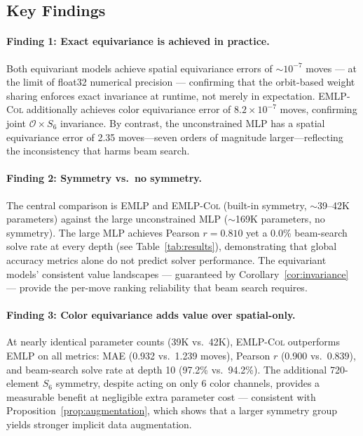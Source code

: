 \documentclass[11pt]{article}
\begin{document}
\subsection{Key Findings}

\paragraph{Finding 1: Exact equivariance is achieved in practice.}
Both equivariant models achieve spatial equivariance errors of
${\sim}10^{-7}$ moves — at the limit of float32 numerical precision —
confirming that the orbit-based weight sharing enforces exact invariance
at runtime, not merely in expectation.
\textsc{EMLP-Col} additionally achieves color equivariance error of
$8.2{\times}10^{-7}$ moves, confirming joint $\mathcal{O} \times S_6$
invariance.
By contrast, the unconstrained \textsc{MLP} has a spatial equivariance
error of 2.35 moves—seven orders of magnitude larger—reflecting the
inconsistency that harms beam search.

\paragraph{Finding 2: Symmetry vs.\ no symmetry.}
The central comparison is \textsc{EMLP} and \textsc{EMLP-Col}
(built-in symmetry, ${\sim}$39--42K parameters) against the large unconstrained
\textsc{MLP} (${\sim}$169K parameters, no symmetry).
The large \textsc{MLP} achieves Pearson
$r = 0.810$ yet a 0.0\% beam-search solve rate at every depth (see
Table~\ref{tab:results}), demonstrating that global accuracy metrics
alone do not predict solver performance.
The equivariant models' consistent value landscapes — guaranteed by
Corollary~\ref{cor:invariance} — provide the per-move ranking reliability
that beam search requires.

\paragraph{Finding 3: Color equivariance adds value over spatial-only.}
At nearly identical parameter counts (39K vs.\ 42K), \textsc{EMLP-Col}
outperforms \textsc{EMLP} on all metrics: MAE (0.932 vs.\ 1.239 moves),
Pearson $r$ (0.900 vs.\ 0.839), and beam-search solve rate at depth 10
(97.2\% vs.\ 94.2\%).
The additional 720-element $S_6$ symmetry, despite acting on only 6 color
channels, provides a measurable benefit at negligible extra parameter cost —
consistent with Proposition~\ref{prop:augmentation}, which shows that a
larger symmetry group yields stronger implicit data augmentation.
\end{document}
